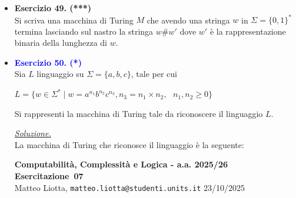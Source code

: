 \documentclass[a4paper,10pt]{article}
\makeatletter
\newcommand{\EsercitazioneNum}{07}
\newcommand{\Data}{23/10/2025}
\newcommand{\DocType}{Esercitazione} %
\newcommand{\FullTitle}{\DocType\ \EsercitazioneNum}
\newcommand{\Header}{
\noindent
  \small \textbf{Computabilità, Complessità e Logica - a.a. 2025/26} \hfill \textbf{\FullTitle} \\[0.2cm]
  \scriptsize Matteo Liotta, \texttt{matteo.liotta@studenti.units.it} \hfill \Data \\[0.2cm]
  \noindent\makebox[\linewidth]{\rule{\linewidth}{0.4pt}} \\[0.3cm]}
\newcommand{\NewPageHeader}{
  \vfill
  \noindent\makebox[\linewidth]{\rule{\linewidth}{0.4pt}}
  \newpage
  {\Header}
}
\makeatother
\begin{document}
{\begin{itemize}[label=, leftmargin=0pt]
\begin{osservazioni}
\begin{center}
\begin{tikzpicture}[shorten >=1pt, node distance=2cm, on grid, auto]
        
    \end{tikzpicture}
    \end{center}
    
    \end{osservazioni}

    \item \textbf{Esercizio 49. (***)}\\ Si scriva una macchina di Turing $M$ che avendo una stringa $w$ in $\Sigma=\{0, 1\}^*$ termina lasciando sul nastro la stringa $w\# w'$ dove $w'$ è la rappresentazione binaria della lunghezza di $w$.\\[0.1cm]

    
    \item \textcolor{blue}{\textbf{Esercizio 50. (*)}}\\ Sia $L$ linguaggio su $\Sigma=\{a,b,c\}$, tale per cui 
    {\begin{center}
        $L = \{ w \in \Sigma^* \mid w = a^{n_1}b^{n_2}c^{n_3}, n_3 = n_1\times n_2, \ \ \ n_1,n_2\geq 0\}$
    \end{center}} 
    Si rappresenti la macchina di Turing tale da riconoscere il linguaggio $L$.\\[0.1cm]

    
    \begin{osservazioni}
    \underline{\textit{Soluzione.}}\\
    La macchina di Turing che riconosce il linguaggio è la seguente:
    \end{osservazioni}
    \NewPageHeader

    \begin{osservazioni}

    \begin{center}
\end{center}
\end{osservazioni}
\end{itemize}}
\end{document}
